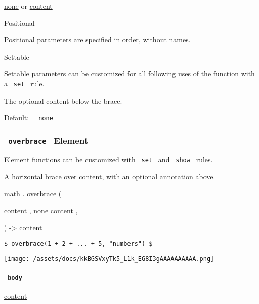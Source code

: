\href{/docs/reference/foundations/none/}{none} {or}
\href{/docs/reference/foundations/content/}{content}

{{ Positional }}

\label{functions-underbrace-annotation-positional-tooltip}
Positional parameters are specified in order, without names.

{{ Settable }}

\label{functions-underbrace-annotation-settable-tooltip}
Settable parameters can be customized for all following uses of the
function with a \texttt{\ set\ } rule.

The optional content below the brace.

Default: \texttt{\ }{\texttt{\ none\ }}\texttt{\ }

\subsubsection{\texorpdfstring{\texttt{\ overbrace\ } {{ Element
}}}{ overbrace   Element }}\label{functions-overbrace}

\label{functions-overbrace-element-tooltip}
Element functions can be customized with \texttt{\ set\ } and
\texttt{\ show\ } rules.

A horizontal brace over content, with an optional annotation above.

math { . } { overbrace } (

{ \href{/docs/reference/foundations/content/}{content} , } {
\hyperref[functions-overbrace-parameters-annotation]{}
\href{/docs/reference/foundations/none/}{none}
\href{/docs/reference/foundations/content/}{content} , }

) -\textgreater{} \href{/docs/reference/foundations/content/}{content}

\begin{verbatim}
$ overbrace(1 + 2 + ... + 5, "numbers") $
\end{verbatim}

\texttt{[image: /assets/docs/kkBGSVxyTk5\_L1k\_EG8I3gAAAAAAAAAA.png]}

\paragraph{\texorpdfstring{\texttt{\ body\ }}{ body }}\label{functions-overbrace-body}

\href{/docs/reference/foundations/content/}{content}


